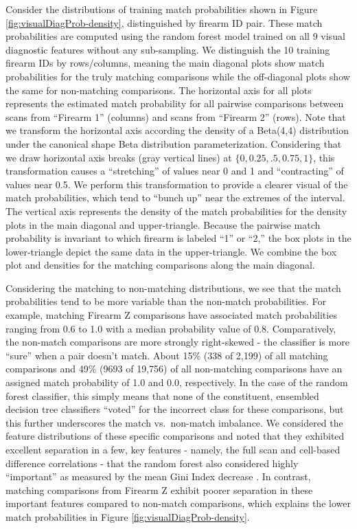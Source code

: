 \documentclass[11pt,]{isuthesis}
\begin{document}
Consider the distributions of training match probabilities shown in Figure \ref{fig:visualDiagProb-density}, distinguished by firearm ID pair.
These match probabilities are computed using the random forest model trained on all 9 visual diagnostic features without any sub-sampling.
We distinguish the 10 training firearm IDs by rows/columns, meaning the main diagonal plots show match probabilities for the truly matching comparisons while the off-diagonal plots show the same for non-matching comparisons.
The horizontal axis for all plots represents the estimated match probability for all pairwise comparisons between scans from ``Firearm 1'' (columns) and scans from ``Firearm 2'' (rows).
Note that we transform the horizontal axis according the density of a Beta(4,4) distribution under the canonical shape Beta distribution parameterization.
Considering that we draw horizontal axis breaks (gray vertical lines) at \(\{0, 0.25, .5, 0.75, 1\}\), this transformation causes a ``stretching'' of values near 0 and 1 and ``contracting'' of values near 0.5.
We perform this transformation to provide a clearer visual of the match probabilities, which tend to ``bunch up'' near the extremes of the interval.
The vertical axis represents the density of the match probabilities for the density plots in the main diagonal and upper-triangle.
Because the pairwise match probability is invariant to which firearm is labeled ``1'' or ``2,'' the box plots in the lower-triangle depict the same data in the upper-triangle.
We combine the box plot and densities for the matching comparisons along the main diagonal.

Considering the matching to non-matching distributions, we see that the match probabilities tend to be more variable than the non-match probabilities.
For example, matching Firearm Z comparisons have associated match probabilities ranging from 0.6 to 1.0 with a median probability value of 0.8.
Comparatively, the non-match comparisons are more strongly right-skewed - the classifier is more ``sure'' when a pair doesn't match.
About 15\% (338 of 2,199) of all matching comparisons and 49\% (9693 of 19,756) of all non-matching comparisons have an assigned match probability of 1.0 and 0.0, respectively.
In the case of the random forest classifier, this simply means that none of the constituent, ensembled decision tree classifiers ``voted'' for the incorrect class for these comparisons, but this further underscores the match vs.~non-match imbalance.
We considered the feature distributions of these specific comparisons and noted that they exhibited excellent separation in a few, key features - namely, the full scan and cell-based difference correlations - that the random forest also considered highly ``important'' as measured by the mean Gini Index decrease \citep{randomForest}.
In contrast, matching comparisons from Firearm Z exhibit poorer separation in these important features compared to non-match comparisons, which explains the lower match probabilities in Figure \ref{fig:visualDiagProb-density}.
\end{document}
